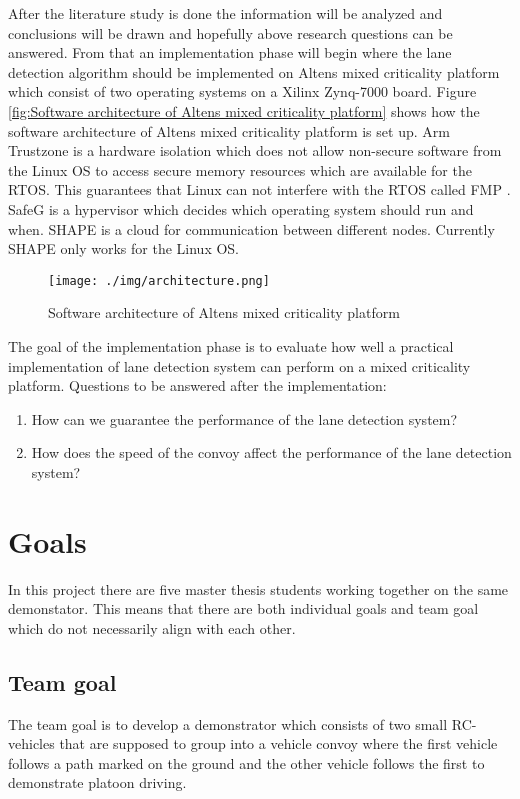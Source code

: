After the literature study is done the information will be analyzed and conclusions will be drawn and hopefully above research questions can be answered. From that an implementation phase will begin where the lane detection algorithm should be implemented on  Altens mixed criticality platform which consist of two operating systems on a Xilinx Zynq-7000 board. Figure \ref{fig:Software architecture of  Altens mixed criticality platform} shows how the software architecture of Altens mixed criticality platform is set up. Arm Trustzone is a hardware isolation which does not allow non-secure software from the Linux OS to access secure memory resources which are available for the RTOS. This guarantees that Linux can not interfere with the RTOS called FMP \cite{zaki2016}. SafeG is a hypervisor which decides which operating system should run and when. SHAPE is a cloud for communication between different nodes. Currently SHAPE only works for the Linux OS.


\begin{figure}[H]
  \texttt{[image: ./img/architecture.png]}
  \centering
  \caption{Software architecture of Altens mixed criticality platform}
  \label{fig:Software architecture of Altens mixed criticality platform}
\end{figure}

The goal of the implementation phase is to evaluate how well a practical implementation of lane detection system can perform on a mixed criticality platform. Questions to be answered after the implementation:

\begin{enumerate}  
\item How can we guarantee the performance of the lane detection system?
\item How does the speed of the convoy affect the performance of the lane detection system?
\end{enumerate}

\section{Goals}
In this project there are five master thesis students working together on the same demonstator. This means that there are both individual goals and team goal which do not necessarily align with each other.

\subsection{Team goal}
The team goal is to develop a demonstrator which consists of two small RC-vehicles that are supposed to group into a vehicle convoy where the first vehicle follows a path marked on the ground and the other vehicle follows the first to demonstrate platoon driving.


